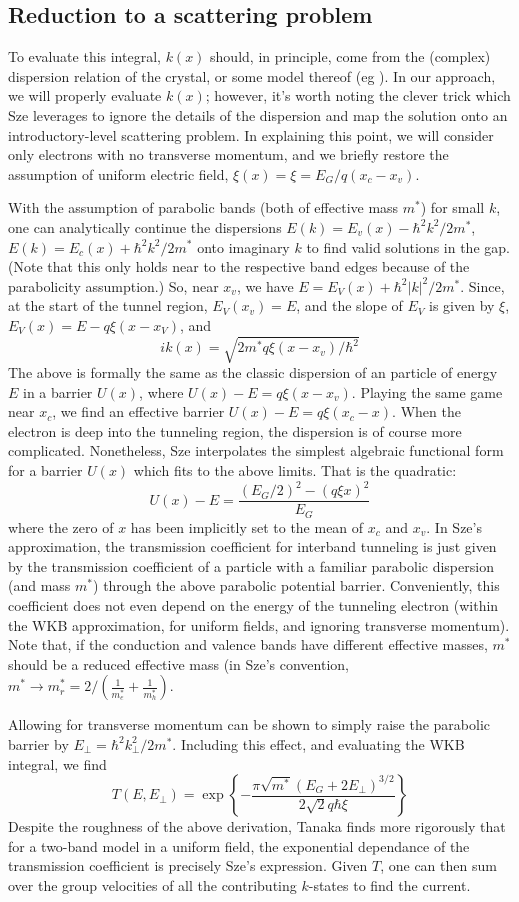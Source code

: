 \subsection{Reduction to a scattering problem}
To evaluate this integral, $k(x)$ should, in principle, come from the (complex) dispersion relation of the crystal, or some model thereof (eg \cite{Guan_2011}).  In our approach, we will properly evaluate $k(x)$; however, it's worth noting the clever trick which Sze leverages to ignore the details of the dispersion and map the solution onto an introductory-level scattering problem.  In explaining this point, we will consider only electrons with no transverse momentum, and we briefly restore the assumption of uniform electric field, $\xi(x)=\xi=E_G/q(x_c-x_v)$.

With the assumption of parabolic bands (both of effective mass $m^*$) for small $k$, one can  analytically continue the dispersions $E(k)=E_v(x)-\hbar^2k^2/2m^*$, $E(k)=E_c(x)+\hbar^2k^2/2m^*$ onto imaginary $k$ to find valid solutions in the gap.  (Note that this only holds near to the respective band edges because of the parabolicity assumption.)  So, near $x_v$, we have $E=E_V(x)+\hbar^2|k|^2/2m^*$.  Since, at the start of the tunnel region, $E_V(x_v)=E$, and the slope of $E_V$ is given by $\xi$, $E_V(x)=E-q\xi(x-x_V)$, and
$$ik(x)=\sqrt{2m^*q\xi(x-x_v)/\hbar^2}$$
The above is formally the same as the classic dispersion of an particle of energy $E$ in a barrier $U(x)$, where $U(x)-E=q\xi(x-x_v)$.  Playing the same game near $x_c$, we find an effective barrier $U(x)-E=q\xi(x_c-x)$.  When the electron is deep into the tunneling region, the dispersion is of course more complicated.  Nonetheless, Sze interpolates the simplest algebraic functional form for a barrier $U(x)$ which fits to the above limits.  That is the quadratic:
$$U(x)-E=\frac{(E_G/2)^2-(q\xi x)^2}{E_G}$$
where the zero of $x$ has been implicitly set to the mean of $x_c$ and $x_v$.  In Sze's approximation, the transmission coefficient for interband tunneling is just given by the transmission coefficient of a particle with a familiar parabolic dispersion (and mass $m^*$) through the above parabolic potential barrier.  Conveniently, this coefficient does not even depend on the energy of the tunneling electron (within the WKB approximation, for uniform fields, and ignoring transverse momentum).  Note that, if the conduction and valence bands have different effective masses, $m^*$ should be a reduced effective mass (in Sze's convention, $m^*\rightarrow m_r^*=2/(\frac{1}{m_e^*}+\frac{1}{m_h^*})$.

Allowing for transverse momentum can be shown to simply raise the parabolic barrier by $E_\perp=\hbar^2k_\perp^2/2m^*$.  Including this effect, and evaluating the WKB integral, we find
$$T(E,E_\perp)=\exp\left\{-\frac{\pi\sqrt{m^*}(E_G+2E_\perp)^{3/2}}{2\sqrt{2}q\hbar\xi}\right\}$$
Despite the roughness of the above derivation, Tanaka \cite{Tanaka_1994} finds more rigorously that for a two-band model in a uniform field, the exponential dependance of the transmission coefficient is precisely Sze's expression.  Given $T$, one can then sum over the group velocities of all the contributing $k$-states to find the current.